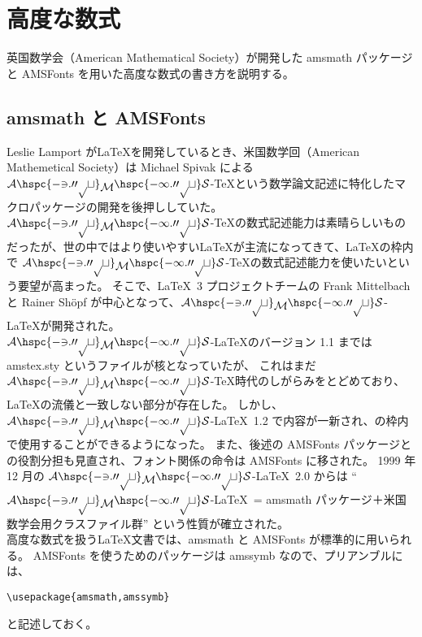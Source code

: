 \chapter{高度な数式}
英国数学会（American Mathematical Society）が開発した amsmath パッケージと AMSFonts を用いた高度な数式の書き方を説明する。
\section{amsmath と AMSFonts}
Leslie Lamport が\LaTeX{}を開発しているとき、米国数学回（American Mathemetical Society）は Michael Spivak による $\mathcal{A\hspc{-3.00pt}\raisebox{-3.00pt}{$\mathcal{M}$}\hspc{-1.00pt}S}$-\TeX{}という数学論文記述に特化したマクロパッケージの開発を後押ししていた。
$\mathcal{A\hspc{-3.00pt}\raisebox{-3.00pt}{$\mathcal{M}$}\hspc{-1.00pt}S}$-\TeX{}の数式記述能力は素晴らしいものだったが、世の中ではより使いやすい\LaTeX{}が主流になってきて、\LaTeX{}の枠内で $\mathcal{A\hspc{-3.00pt}\raisebox{-3.00pt}{$\mathcal{M}$}\hspc{-1.00pt}S}$-\TeX{}の数式記述能力を使いたいという要望が高まった。
そこで、\LaTeX\ 3 プロジェクトチームの Frank Mittelbach と Rainer Sh\"{o}pf が中心となって、$\mathcal{A\hspc{-3.00pt}\raisebox{-3.00pt}{$\mathcal{M}$}\hspc{-1.00pt}S}$-\LaTeX{}が開発された。\\

$\mathcal{A\hspc{-3.00pt}\raisebox{-3.00pt}{$\mathcal{M}$}\hspc{-1.00pt}S}$-\LaTeX{}のバージョン 1.1 までは amstex.sty というファイルが核となっていたが、
これはまだ $\mathcal{A\hspc{-3.00pt}\raisebox{-3.00pt}{$\mathcal{M}$}\hspc{-1.00pt}S}$-\TeX{}時代のしがらみをとどめており、\LaTeX{}の流儀と一致しない部分が存在した。
しかし、$\mathcal{A\hspc{-3.00pt}\raisebox{-3.00pt}{$\mathcal{M}$}\hspc{-1.00pt}S}$-\LaTeX\ 1.2 で内容が一新され、\LaTeXe{}の枠内で使用することができるようになった。
また、後述の AMSFonts パッケージとの役割分担も見直され、フォント関係の命令は AMSFonts に移された。
1999 年 12 月の $\mathcal{A\hspc{-3.00pt}\raisebox{-3.00pt}{$\mathcal{M}$}\hspc{-1.00pt}S}$-\LaTeX\ 2.0 からは ``$\mathcal{A\hspc{-3.00pt}\raisebox{-3.00pt}{$\mathcal{M}$}\hspc{-1.00pt}S}$-\LaTeX\ = amsmath パッケージ＋米国数学会用クラスファイル群'' という性質が確立された。\\

高度な数式を扱う\LaTeX{}文書では、amsmath と AMSFonts が標準的に用いられる。
AMSFonts を使うためのパッケージは amssymb なので、プリアンブルには、
\begin{mdframed}[roundcorner=0.50zw,leftmargin=3.00zw,rightmargin=3.00zw,skipabove=0.40zw,skipbelow=0.40zw,innertopmargin=4.00pt,innerbottommargin=4.00pt,innerleftmargin=5.00pt,innerrightmargin=5.00pt,linecolor=gray!020,linewidth=0.50pt,backgroundcolor=gray!20]
\begin{verbatim}
\usepackage{amsmath,amssymb}
\end{verbatim}
\end{mdframed}
と記述しておく。\\

